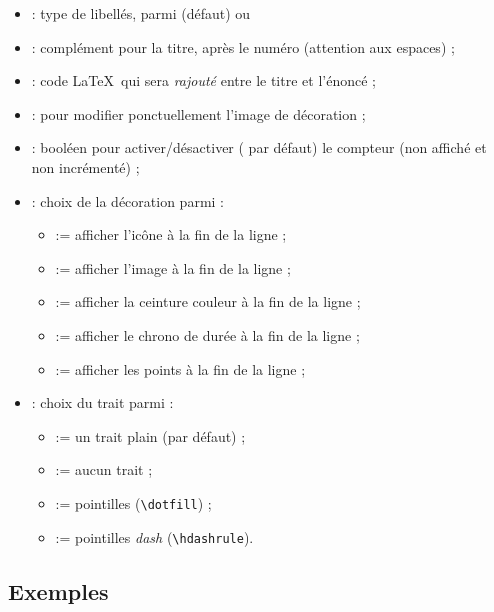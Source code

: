 \documentclass[french,11pt,a4paper]{article}
\begin{document}
\begin{itemize}
	\item {} : type de libellés, parmi  (défaut) ou 
	\item {} : complément pour la titre, après le numéro (attention aux espaces) ;
	\item {} : code \LaTeX\ qui sera \textit{rajouté} entre le titre et l'énoncé ;
	\item {} : pour modifier ponctuellement l'image de décoration ;
	\item {} : booléen pour activer/désactiver ( par défaut) le compteur (non affiché et non incrémenté) ;
	\item {} : choix de la décoration parmi :
	\begin{itemize}
		\item {} := afficher l'icône  à la fin de la ligne ;
		\item {} := afficher l'image  à la fin de la ligne ;
		\item {} := afficher la ceinture couleur  à la fin de la ligne ;
		\item {} := afficher le chrono de durée  à la fin de la ligne ;
		\item {} := afficher les points  à la fin de la ligne ;
	\end{itemize}
	\item {} : choix du trait parmi :
	\begin{itemize}
		\item {} := un trait plain (par défaut) ;
		\item {} := aucun trait ;
		\item {} := pointilles (\texttt{\textbackslash dotfill}) ;
		\item {} := pointilles \textit{dash} (\texttt{\textbackslash hdashrule}).
	\end{itemize}
\end{itemize}

\subsection{Exemples}
\end{document}
